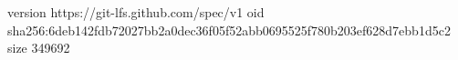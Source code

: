 version https://git-lfs.github.com/spec/v1
oid sha256:6deb142fdb72027bb2a0dec36f05f52abb0695525f780b203ef628d7ebb1d5c2
size 349692
